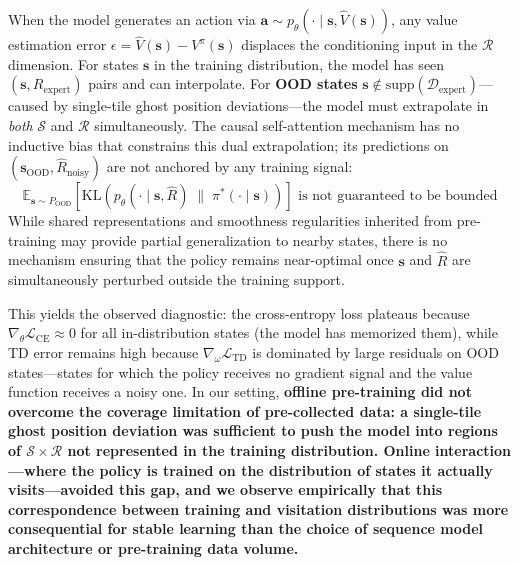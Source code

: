 \documentclass[11pt,a4paper]{article}
\theoremstyle{definition}
\begin{document}
When the model generates an action via $\mathbf{a} \sim p_\theta(\cdot \mid \mathbf{s}, \hat{V}(\mathbf{s}))$, any value estimation error $\epsilon = \hat{V}(\mathbf{s}) - V^\pi(\mathbf{s})$ displaces the conditioning input in the $\mathcal{R}$ dimension.
For states $\mathbf{s}$ in the training distribution, the model has seen $(\mathbf{s}, R_{\text{expert}})$ pairs and can interpolate.
For \textbf{OOD states} $\mathbf{s} \notin \text{supp}(\mathcal{D}_{\text{expert}})$---caused by single-tile ghost position deviations---the model must extrapolate in \textit{both} $\mathcal{S}$ and $\mathcal{R}$ simultaneously.
The causal self-attention mechanism has no inductive bias that constrains this dual extrapolation; its predictions on $(\mathbf{s}_{\text{OOD}}, \hat{R}_{\text{noisy}})$ are not anchored by any training signal:
\begin{equation}
\mathbb{E}_{\mathbf{s} \sim P_{\text{OOD}}}\left[ \text{KL}(p_\theta(\cdot \mid \mathbf{s}, \hat{R}) \;\|\; \pi^*(\cdot \mid \mathbf{s})) \right] \text{ is not guaranteed to be bounded}
\end{equation}
While shared representations and smoothness regularities inherited from pre-training may provide partial generalization to nearby states, there is no mechanism ensuring that the policy remains near-optimal once $\mathbf{s}$ and $\hat{R}$ are simultaneously perturbed outside the training support.

This yields the observed diagnostic: the cross-entropy loss plateaus because $\nabla_\theta \mathcal{L}_{\text{CE}} \approx 0$ for all in-distribution states (the model has memorized them), while TD error remains high because $\nabla_\omega \mathcal{L}_{\text{TD}}$ is dominated by large residuals on OOD states---states for which the policy receives no gradient signal and the value function receives a noisy one.
In our setting, \textbf{offline pre-training did not overcome the coverage limitation of pre-collected data: a single-tile ghost position deviation was sufficient to push the model into regions of $\mathcal{S} \times \mathcal{R}$ not represented in the training distribution. Online interaction---where the policy is trained on the distribution of states it actually visits---avoided this gap, and we observe empirically that this correspondence between training and visitation distributions was more consequential for stable learning than the choice of sequence model architecture or pre-training data volume.}
\end{document}
